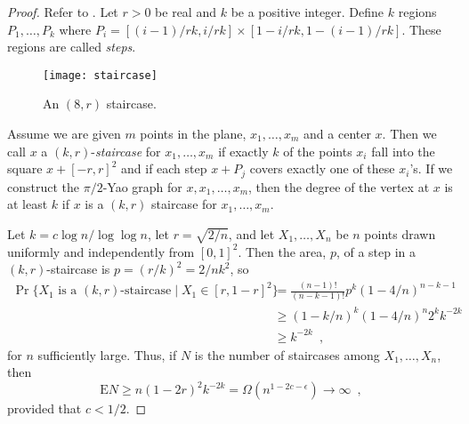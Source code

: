 \documentclass[lotsofwhite,charterfonts]{patmorin}
\newcommand{\EXP}{\mathrm{E}}
\begin{document}
\begin{proof}
Refer to .  Let $r>0$ be real and $k$ be a positive
integer.  Define $k$ regions $P_1,\ldots,P_k$ where $P_i =
[(i-1)/rk,i/rk]\times [1-i/rk,1-(i-1)/rk]$.  These regions are called
\emph{steps}. 

\begin{figure}
  \begin{center}
    \texttt{[image: staircase]}
  \end{center}
  \caption{An $(8,r)$ staircase.}
\end{figure}

Assume we are given $m$ points in the plane, $x_1,\ldots,x_m$ and a center
$x$.  Then we call $x$ a $(k,r)$-\emph{staircase} for $x_1 , \ldots , x_m$
if exactly $k$ of the points $x_i$ fall into the square $x+[-r,r]^2$ and if
each step $x+P_j$ covers exactly one of these $x_i$'s.
If we construct the $\pi/2$-Yao graph for $x,x_1,\ldots,x_m$, then the
degree of the vertex at $x$ is at least $k$ if $x$ is a $(k,r)$ staircase for
$x_1,\ldots,x_m$.

Let $k=c\log n/\log \log n$, let $r=\sqrt{2/n}$, and let $X_1,\ldots,X_n$
be $n$ points drawn uniformly and independently from $[0,1]^2$.  Then the
area, $p$, of a step in a $(k,r)$-staircase is $p=(r/k)^2=2/nk^2$, so
\[
  \begin{aligned}
     \Pr\{\mbox{$X_1$ is a $(k,r)$-staircase} \mid X_1\in[r,1-r]^2\}
        & = \frac{(n-1)!}{(n-k-1)!} p^k (1-4/n)^{n-k-1} \\
        & \ge (1-k/n)^k (1-4/n)^{n} 2^k k^{-2k} \\
        & \ge k^{-2k} \enspace ,
  \end{aligned}
\]
for $n$ sufficiently large.
Thus, if $N$ is the number of staircases among $X_1,\ldots,X_n$, then
\[
  \EXP{N}\ge n(1-2r)^2k^{-2k}
    = \Omega(n^{1-2c-\epsilon})
      \rightarrow\infty \enspace ,
\]
provided that $c < 1/2$.


\end{proof}
\end{document}
